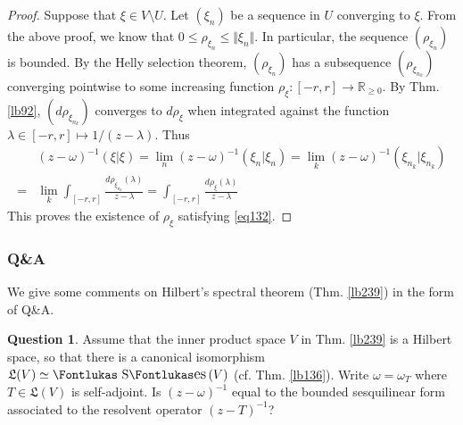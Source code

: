 \documentclass[12pt,b5paper,notitlepage]{article}
\theoremstyle{definition}
\newtheorem{question}[df]{Question}
\theoremstyle{plain}
\DeclareMathOperator{\Ses}{\text{\Fontlukas S}\text{\kern -0pt {\Fontlukas\large es}}\,}
\newcommand{\fk}{\mathfrak}
\newcommand{\Rbb}{\mathbb R}
\numberwithin{equation}{section}
\begin{document}
\begin{proof}
Suppose that $\xi\in V\setminus U$. Let $(\xi_n)$ be a sequence in $U$ converging to $\xi$. From the above proof, we know that $0\leq\rho_{\xi_n}\leq\Vert\xi_n\Vert$. In particular, the sequence $(\rho_{\xi_n})$ is bounded. By the Helly selection theorem,  $(\rho_{\xi_n})$ has a subsequence $(\rho_{\xi_{n_k}})$ converging pointwise to some increasing function $\rho_\xi:[-r,r]\rightarrow\Rbb_{\geq0}$. By Thm. \ref{lb92}, $(d\rho_{\xi_{n_k}})$ converges to $d\rho_\xi$ when integrated against the function $\lambda\in[-r,r]\mapsto 1/(z-\lambda)$. Thus
\begin{align*}
&(z-\omega)^{-1}(\xi|\xi)=\lim_n(z-\omega)^{-1}(\xi_n|\xi_n)=\lim_k(z-\omega)^{-1}(\xi_{n_k}|\xi_{n_k})\\
=&\lim_k\int_{[-r,r]}\frac{d\rho_{\xi_{n_k}}(\lambda)}{z-\lambda}=\int_{[-r,r]}\frac{d\rho_\xi(\lambda)}{z-\lambda}
\end{align*}
This proves the existence of $\rho_\xi$ satisfying \eqref{eq132}.
\end{proof}




\subsubsection{Q\&A}


We give some comments on Hilbert's spectral theorem (Thm. \ref{lb239}) in the form of Q\&A.


\begin{question}\label{lb242}
Assume that the inner product space $V$ in Thm. \ref{lb239} is a Hilbert space, so that there is a canonical isomorphism $\fk L(V)\simeq\Ses(V)$ (cf. Thm. \ref{lb136}). Write $\omega=\omega_T$ where $T\in\fk L(V)$ is self-adjoint. Is $(z-\omega)^{-1}$ equal to the bounded sesquilinear form associated to the resolvent operator $(z-T)^{-1}$?
\end{question}
\end{document}
